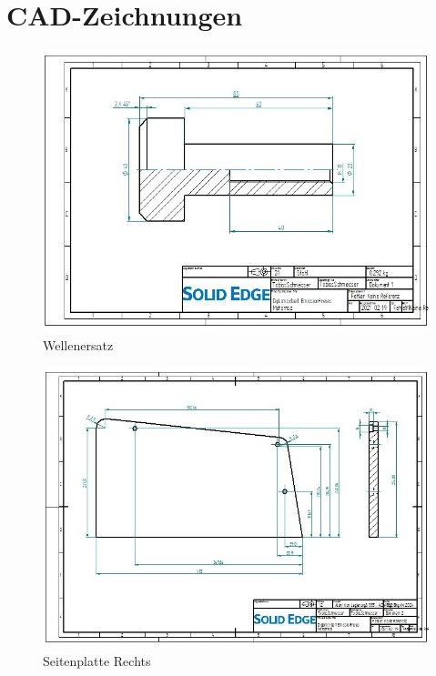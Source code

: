 \chapter{CAD-Zeichnungen}

\newpage

\begin{figure} [H]
	\begin{center}
		\includegraphics[angle=90, scale=0.9] {figures/mechanik/Welle_Rechts_Zeichnung.jpg}
		\caption{Wellenersatz}
		\label{fig:Wellenersatz1}
	\end{center}
\end{figure}

\begin{figure} [H]
	\begin{center}
		\includegraphics[angle=90]{figures/mechanik/Seitenplatte_Fertigung_Rechts.jpg}
		\caption{Seitenplatte Rechts}
		\label{fig:SeitenplatteRechts}
	\end{center}
\end{figure}

